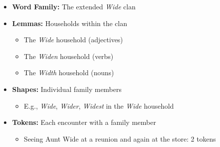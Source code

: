 \begin{tcolorbox}[title=A Family Analogy]
\begin{itemize}
    \item \textbf{Word Family:} The extended \textit{Wide} clan
    \item \textbf{Lemmas:} Households within the clan
    \begin{itemize}
        \item The \textit{Wide} household (adjectives)
        \item The \textit{Widen} household (verbs)
        \item The \textit{Width} household (nouns)
    \end{itemize}
    \item \textbf{Shapes:} Individual family members
    \begin{itemize}
        \item E.g., \textit{Wide}, \textit{Wider}, \textit{Widest} in the \textit{Wide} household
    \end{itemize}
    \item \textbf{Tokens:} Each encounter with a family member
    \begin{itemize}
        \item Seeing Aunt Wide at a reunion and again at the store: 2 tokens
    \end{itemize}
\end{itemize}
\end{tcolorbox}


